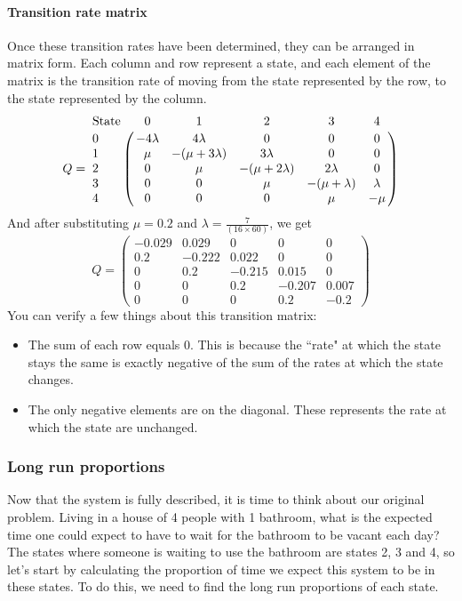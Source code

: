 \paragraph{Transition rate matrix}
Once these transition rates have been determined, they can be arranged in matrix form. Each column and row represent a state, and each element of the matrix is the transition rate of moving from the state represented by the row, to the state represented by the column.
$$
Q=
\bordermatrix{	\text{State} 	&\text{0} 	&\text{1}	& \text{2} 	& \text{3} 	& \text{4} \cr
\text{0} 	& -4\lambda &	4\lambda	&	0 			& 0 			& 0	\cr
\text{1} 	&   \mu  	&-(\mu+3\lambda)&3\lambda 		& 0 			& 0	\cr
\text{2} 	&   0  		&	\mu			&-(\mu+2\lambda)&2\lambda 		& 0	\cr
\text{3} 	&   0  		&	0			&	\mu 		&-(\mu+\lambda)	& \lambda\cr
\text{4}	&	0		&	0			&	0			& \mu 			& -\mu}
$$
And after substituting $\mu = 0.2 $ and $\lambda = \frac{7}{(16 \times 60)} $, we get
$$ Q=
\begin{pmatrix}
-0.029	&	0.029	&	0 		& 0 		& 0	\\
0.2  	&	-0.222	& 0.022 	& 0 		& 0	\\
0  		&	0.2		&-0.215		&0.015 		& 0	\\
0  		&	0		&	0.2 	&-0.207		& 0.007\\
0		&	0		&	0		& 0.2 		& -0.2
\end{pmatrix}
$$
You can verify a few things about this transition matrix:
\begin{itemize}
	\item The sum of each row equals 0. This is because the ``rate" at which the state stays the same is exactly negative of the sum of the rates at which the state changes.
	\item The only negative elements are on the diagonal. These represents the rate at which the state are unchanged.
\end{itemize}


\subsubsection*{Long run proportions}
Now that the system is fully described, it is time to think about our original problem. Living in a house of 4 people with 1 bathroom, what is the expected time one could expect to have to wait for the bathroom to be vacant each day? The states where someone is waiting to use the bathroom are states 2, 3 and 4, so let's start by calculating the proportion of time we expect this system to be in these states. To do this, we need to find the long run proportions of each state.

